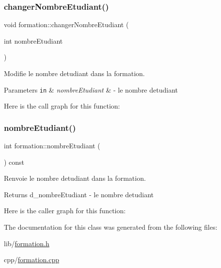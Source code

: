 \subsubsection{\texorpdfstring{changer\+Nombre\+Etudiant()}{changerNombreEtudiant()}}
{\footnotesize\ttfamily void formation\+::changer\+Nombre\+Etudiant (\begin{DoxyParamCaption}\item[{int}]{nombre\+Etudiant }\end{DoxyParamCaption})}



Modifie le nombre d\textquotesingle{}etudiant dans la formation. 


\begin{DoxyParams}[1]{Parameters}
\mbox{\tt in}  & {\em nombre\+Etudiant} & -\/ le nombre d\textquotesingle{}etudiant \\
\hline
\end{DoxyParams}
Here is the call graph for this function\+:
\hypertarget{classformation_a917c18b3f7439abad5114b5a89b1a01a}{}\label{classformation_a917c18b3f7439abad5114b5a89b1a01a} 
\subsubsection{\texorpdfstring{nombre\+Etudiant()}{nombreEtudiant()}}
{\footnotesize\ttfamily int formation\+::nombre\+Etudiant (\begin{DoxyParamCaption}{ }\end{DoxyParamCaption}) const}



Renvoie le nombre d\textquotesingle{}etudiant dans la formation. 

\begin{DoxyReturn}{Returns}
d\+\_\+nombre\+Etudiant -\/ le nombre d\textquotesingle{}etudiant 
\end{DoxyReturn}
Here is the caller graph for this function\+:


The documentation for this class was generated from the following files\+:\begin{DoxyCompactItemize}
\item 
lib/\hyperlink{formation_8h}{formation.\+h}\item 
cpp/\hyperlink{formation_8cpp}{formation.\+cpp}\end{DoxyCompactItemize}
